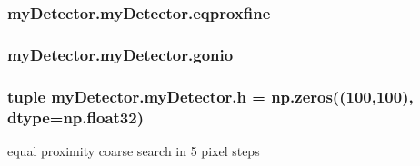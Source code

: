 \hypertarget{classmy_detector_1_1my_detector_a974a82a8a03332b7a567195ec72ad536}{
\subsubsection[{eqproxfine}]{\setlength{\rightskip}{0pt plus 5cm}my\-Detector.\-my\-Detector.\-eqproxfine}}\label{classmy_detector_1_1my_detector_a974a82a8a03332b7a567195ec72ad536}
\hypertarget{classmy_detector_1_1my_detector_a854d0f8e848ba2cbc9c4b85ed6e1e1fc}{
\subsubsection[{gonio}]{\setlength{\rightskip}{0pt plus 5cm}my\-Detector.\-my\-Detector.\-gonio}}\label{classmy_detector_1_1my_detector_a854d0f8e848ba2cbc9c4b85ed6e1e1fc}
\hypertarget{classmy_detector_1_1my_detector_afcb68bb2db834b6bb8c53cb194cf92bf}{
\subsubsection[{h}]{\setlength{\rightskip}{0pt plus 5cm}tuple my\-Detector.\-my\-Detector.\-h = np.\-zeros((100,100), dtype=np.\-float32)\hspace{0.3cm}{\ttfamily [static]}}}\label{classmy_detector_1_1my_detector_afcb68bb2db834b6bb8c53cb194cf92bf}


equal proximity coarse search in 5 pixel steps 

